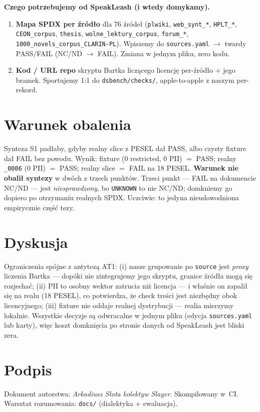 \textbf{Czego potrzebujemy od SpeakLeash (i wtedy domykamy).}
\begin{enumerate}
  \item \textbf{Mapa SPDX per źródło} dla 76 źródeł (\texttt{plwiki}, \texttt{web\_synt\_*},
        \texttt{HPLT\_*}, \texttt{CEON\_corpus}, \texttt{thesis},
        \texttt{wolne\_lektury\_corpus}, \texttt{forum\_*},
        \texttt{1000\_novels\_corpus\_CLARIN-PL}). Wpiszemy do \texttt{sources.yaml}
        $\to$ twardy PASS/FAIL (NC/ND $\to$ FAIL). Zmiana w jednym pliku, zero kodu.
  \item \textbf{Kod / URL repo} skryptu Bartka liczącego licencję per-źródło + jego
        bramek. Sportujemy 1:1 do \texttt{dsbench/checks/}, apple-to-apple z naszym
        per-rekord.
\end{enumerate}

\section{Warunek obalenia}
Synteza S1 padłaby, gdyby realny slice z PESEL dał PASS, albo czysty fixture dał FAIL
bez powodu. Wynik: fixture (0 restricted, 0 PII) $=$ PASS; realny \texttt{\_0006}
(0 PII) $=$ PASS; realny slice $=$ FAIL na 18 PESEL. \textbf{Warunek nie obalił
syntezy} w dwóch z trzech punktów. Trzeci punkt --- FAIL na dokumencie NC/ND --- jest
\emph{niesprawdzony}, bo \texttt{UNKNOWN} to nie NC/ND; domkniemy go dopiero po
otrzymaniu realnych SPDX. Uczciwie: to jedyna nieudowodniona empirycznie część tezy.

\section{Dyskusja}
Ograniczenia spójne z antytezą AT1: (i) nasze grupowanie po \texttt{source} jest
\emph{proxy} liczenia Bartka --- dopóki nie zintegrujemy jego skryptu, granice źródła
mogą się rozjechać; (ii) PII to osobny wektor zatrucia niż licencja --- i właśnie on
zapalił się na realu (18 PESEL), co potwierdza, że check treści jest niezbędny obok
licencyjnego; (iii) fixture nie oddaje realnej dystrybucji --- realia mierzymy lokalnie.
Wszystkie decyzje są odwracalne w jednym pliku (edycja \texttt{sources.yaml} lub karty),
więc koszt domknięcia po stronie danych od SpeakLeash jest bliski zera.

\section*{Podpis}
Dokument autorstwa: \emph{Arkadiusz Słota \textperiodcentered{} kolektyw Slayer}.
Skompilowany w~CI. Warsztat rozumowania: \texttt{docs/} (dialektyka + ewaluacja).

